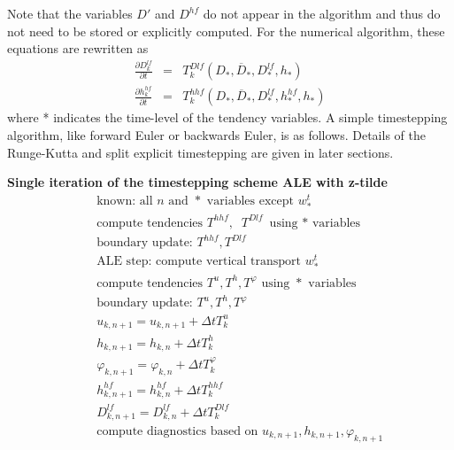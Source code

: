 \documentclass[11pt]{report}
\newcommand{\ds}{\displaystyle}
\newcommand{\bea}{\begin{eqnarray}}
\newcommand{\eea}{\end{eqnarray}}
\begin{document}
Note that the variables $D'$ and $D^{hf}$ do not appear in the algorithm and thus do not need to be stored or explicitly computed.  For the numerical algorithm, these equations are rewritten as
\bea
\label{h1t2} \ds
  \frac{\partial D^{lf}_k}{\partial t} &=& T^{Dlf}_k(D_{*}, {\overline D}_*,D^{lf}_{*},h_*) \\
  \frac{\partial h^{hf}_k}{\partial t} &=& T^{hhf}_k(D_{*}, {\overline D}_*, D^{lf}_{*}, h_{*}^{hf},h_*)
\eea
where * indicates the time-level of the tendency variables.  A simple timestepping algorithm, like forward Euler or backwards Euler, is as follows.  Details of the Runge-Kutta and split explicit timestepping are given in later sections.

{\bf Single iteration of the timestepping scheme ALE with z-tilde}
\begin{eqnarray} &&
\mbox{known: all $n$ and $*$ variables except $w^t_*$}\\&&
\mbox{compute tendencies } 
T^{hhf}, \;\;
T^{Dlf} \mbox{ using $*$ variables} \\ && 
\mbox{boundary update: } T^{hhf},T^{Dlf}\\&& 
\mbox{ALE step: compute vertical transport $w^t_*$} \\&&
\mbox{compute tendencies $T^u, T^h, T^\varphi $ using $*$ variables}\\ && 
\mbox{boundary update: } T^u,T^h,T^\varphi\\&& 
u_{k,n+1} = u_{k,n+1} + \Delta t T^u_k \\&& 
h_{k,n+1} = h_{k,n} + \Delta t T^h_k \\&& 
{\varphi}_{k,n+1} =  \varphi_{k,n} + \Delta t  T^\varphi_k \\&&
h^{hf}_{k,n+1} = h^{hf}_{k,n} + \Delta t T^{hhf}_k \\&& 
D^{lf}_{k,n+1} = D^{lf}_{k,n} + \Delta t T^{Dlf}_k \\&& 
\mbox{compute diagnostics based on }u_{k,n+1},h_{k,n+1},\varphi_{k,n+1} 
\end{eqnarray}

\end{document}
